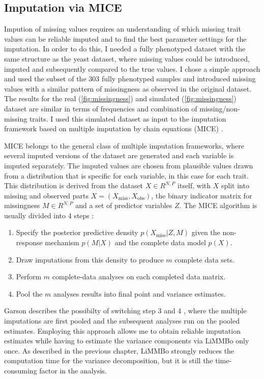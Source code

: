 \subsection{Imputation via MICE} 
Impution of missing values requires an understanding of which missing trait values can be reliable imputed and to find the best parameter settings for the imputation. In order to do this, I needed a fully phenotyped dataset with the same structure as the yeast dataset, where missing values could be introduced, imputed and subsequently compared to the true values. I chose a simple approach and used the subset of the \num{303} fully phenotyped samples and introduced missing values with a similar pattern of missingness as observed in the original dataset. The results for the real (\cref{fig:missingness}) and simulated (\cref{fig:missingness}) dataset are similar in terms of frequencies and combination of missing/non-missing traits. I used this simulated dataset as input to the imputation framework based on multiple imputation by chain equations (MICE) \citep{vanBuuren2011}. 

MICE belongs to the general class of multiple imputation frameworks, where several imputed versions of the dataset are generated and each variable is imputed separately. The imputed values are chosen from plausible values drawn from a distribution that is specific for each variable, in this case for each trait. This distribution is derived from the dataset \(X \in R^{N,P}\) itself,  with \(X\) split into missing and observed parts \(X = (X_\text{miss}, X_\text{obs})\), the binary indicator matrix for missingness \(M \in R^{N,P}\) and a set of predictor variables \(Z\). The MICE algorithm is usually divided into \num{4} steps \citep{Rubin1978,vanBuuren1999,Pigott2001}:
\begin{enumerate}
\item Specify the posterior predictive density \(p(X_\text{miss} | Z, M)\) given the non-response mechanism  \(p(M | X)\)  and the complete data model  \(p(X)\).
\item Draw imputations from this density to produce \(m\) complete data sets. 
\item Perform \(m\) complete-data analyses on each completed data matrix. 
\item Pool the \(m\) analyses results into final point and variance estimates.
\end{enumerate}
Garson describes the possibilty of switching step \num{3} and \num{4} \citeyear{Garson2015}, where the multiple imputations are first pooled and the subsequent analyses run on the pooled estimates. Employing this approach allows me to  obtain reliable imputation estimates while having to estimate the variance components via LiMMBo only once. As described in the previous chapter, LiMMBo strongly reduces the computation time for the variance decomposition, but it is still the time-consuming factor in the analysis. 

